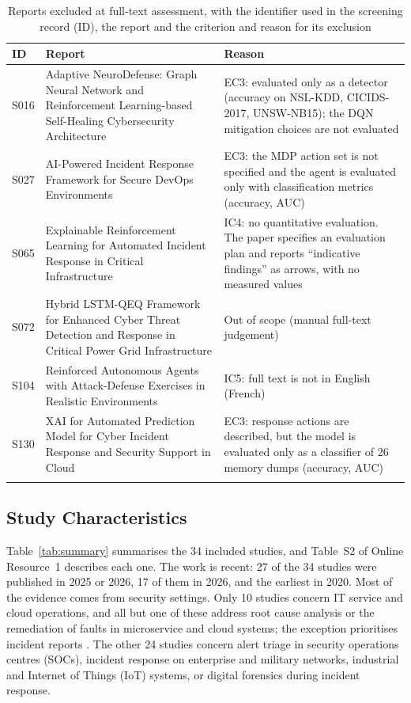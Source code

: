 \documentclass[pdflatex,sn-basic]{sn-jnl}
\begin{document}
\begin{table}[!htbp]
\caption{Reports excluded at full-text assessment, with the identifier used in the screening record (ID), the report and the criterion and reason for its exclusion}\label{tab:ftexcl}
\footnotesize
\begin{tabularx}{\textwidth}{@{}lP{4.6cm}L@{}}
\toprule
ID & Report & Reason \\
\midrule
S016 & Adaptive NeuroDefense: Graph Neural Network and Reinforcement Learning-based Self-Healing Cybersecurity Architecture \citep{manojkumar2026} & EC3: evaluated only as a detector (accuracy on NSL-KDD, CICIDS-2017, UNSW-NB15); the DQN mitigation choices are not evaluated \\
S027 & AI-Powered Incident Response Framework for Secure DevOps Environments \citep{bompally2026} & EC3: the MDP action set is not specified and the agent is evaluated only with classification metrics (accuracy, AUC) \\
S065 & Explainable Reinforcement Learning for Automated Incident Response in Critical Infrastructure \citep{alauthman2026} & IC4: no quantitative evaluation. The paper specifies an evaluation plan and reports ``indicative findings'' as arrows, with no measured values \\
S072 & Hybrid LSTM-QEQ Framework for Enhanced Cyber Threat Detection and Response in Critical Power Grid Infrastructure & Out of scope (manual full-text judgement) \\
S104 & Reinforced Autonomous Agents with Attack-Defense Exercises in Realistic Environments & IC5: full text is not in English (French) \\
S130 & XAI for Automated Prediction Model for Cyber Incident Response and Security Support in Cloud \citep{reddyavula2026} & EC3: response actions are described, but the model is evaluated only as a classifier of 26 memory dumps (accuracy, AUC) \\
\botrule
\end{tabularx}
\end{table}

\subsection{Study Characteristics}

Table~\ref{tab:summary} summarises the 34 included studies, and Table~S2 of Online Resource~1 describes each one. The work is recent: 27 of the 34 studies were published in 2025 or 2026, 17 of them in 2026, and the earliest in 2020. Most of the evidence comes from security settings. Only 10 studies concern IT service and cloud operations, and all but one of these address root cause analysis or the remediation of faults in microservice and cloud systems; the exception prioritises incident reports \citep{peralta2025}. The other 24 studies concern alert triage in security operations centres (SOCs), incident response on enterprise and military networks, industrial and Internet of Things (IoT) systems, or digital forensics during incident response.
\end{document}

